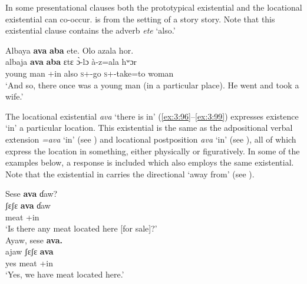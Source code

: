 In some presentational clauses both the prototypical existential and the locational existential can co-occur.   is from the setting of a story story. Note that this existential clause contains the adverb \textit{ete} ‘also.’

\ea \label{ex:3:95}
Albaya  \textbf{ava}  \textbf{aba}  ete.  Olo  azala  hor.\\
\gll  albaja  \textbf{ava}    \textbf{aba}  ɛtɛ   \`{ɔ}-lɔ    à-z=ala    hʷɔr\\
      {young man}  {\EXT}+in   {\EXT}  also  \textsc{s}+{\PFV}-go    \textsc{s}+{\PFV}-take=to    woman\\
\glt  ‘And so, there once was a young man (in a particular place). He went and took a wife.’
\z

The locational existential \textit{ava} ‘there is in’ (\ref{ex:3:96}--\ref{ex:3:99}) expresses existence ‘in’ a particular location. This existential is the same as the adpositional verbal extension \textit{=ava} ‘in’ (see ) and locational postposition \textit{ava} ‘in’ (see ), all of which express the location in something, either physically or figuratively. In some of the examples below, a response is included which also employs the same existential. Note that the existential in  carries the directional ‘away from’ (see ).

\ea\label{ex:3:96}
\ea Sese  \textbf{ava}  ɗaw? \\
\gll  ʃɛʃɛ    \textbf{ava}  ɗaw   \\
      meat  {\EXT}+in  {\QUEST}   \\
\glt  ‘Is there any meat located here [for sale]?’  \\

\medskip
\ex
Ayaw,  sese  \textbf{ava.}\\
\gll ajaw  ʃɛʃɛ  \textbf{ava}\\
     yes  meat  {\EXT}+in\\
\glt ‘Yes, we have meat located here.’\\
\z\z

